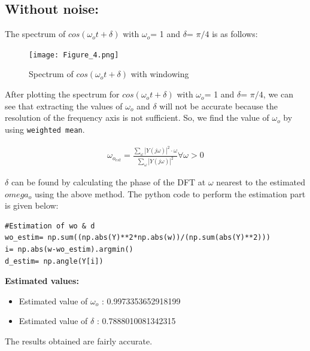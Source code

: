 \documentclass[11pt, a4paper]{article}
\begin{document}
\subsection{Without noise:}
The spectrum of $cos(\omega_o t + \delta)$ with $\omega_o$= 1 and $\delta$= $\pi/4$ is as follows:
            \begin{figure}[H]
            \centering
            \texttt{[image: Figure\_4.png]}
            \caption{Spectrum of $cos(\omega_o t + \delta)$  with windowing}
            \label{fig:Fig5}
        \end{figure}
After plotting the spectrum for $cos(\omega_o t + \delta)$ with $\omega_o$= 1 and $\delta$= $\pi/4$, we can see that extracting the values of $\omega_o$ and $\delta$ will not be accurate because the resolution of the frequency axis is not sufficient.\newline
So, we find the value of $\omega_o$ by using \texttt{weighted mean}.
    
    \begin{gather*}
        \omega_{o_{est}} = \frac{\sum_{\omega}|Y(j\omega)|^2\cdot \omega}{\sum_{\omega}|Y(j\omega)|^2} \forall \omega > 0
    \end{gather*}

$\delta$ can be found by calculating the phase of the DFT at $\omega$
nearest to the estimated $omega_o$ using the above method.\newline
The python code to perform the estimation part is given below:
    \lstset{language=Python}
    \lstset{basicstyle=\footnotesize}
    \begin{lstlisting}
#Estimation of wo & d
wo_estim= np.sum((np.abs(Y)**2*np.abs(w))/(np.sum(abs(Y)**2)))      
i= np.abs(w-wo_estim).argmin()         
d_estim= np.angle(Y[i]) 
    \end{lstlisting}
    \textbf{Estimated values:}
    \begin{itemize}
        \item Estimated value of $\omega_o$ : 0.9973353652918199
        \item Estimated value of $\delta$   : 0.7888010081342315
    \end{itemize}
    The results obtained are fairly accurate.
\end{document}
